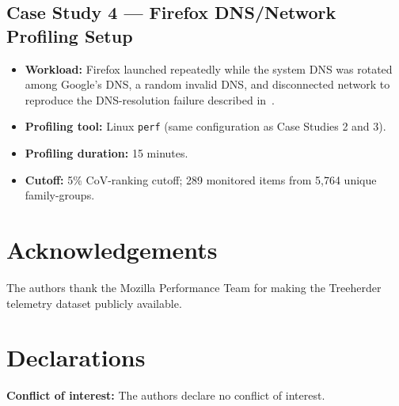 \documentclass[a4paper,fleqn]{cas-sc}
\theoremstyle{plain}
\begin{document}
\subsection*{Case Study 4 --- Firefox DNS/Network Profiling Setup}
\begin{itemize}
  \item \textbf{Workload:} Firefox launched repeatedly while the system DNS
    was rotated among Google's DNS, a random invalid DNS, and disconnected
    network to reproduce the DNS-resolution failure described in~\cite{cook-2022}.
  \item \textbf{Profiling tool:} Linux \texttt{perf} (same configuration as
    Case Studies 2 and 3).
  \item \textbf{Profiling duration:} 15 minutes.
  \item \textbf{Cutoff:} 5\% CoV-ranking cutoff; 289 monitored items from
    5,764 unique family-groups.
\end{itemize}


\section*{Acknowledgements}
The authors thank the Mozilla Performance Team for making the Treeherder
telemetry dataset publicly available.

\section*{Declarations}
\textbf{Conflict of interest:}
The authors declare no conflict of interest.
\end{document}
